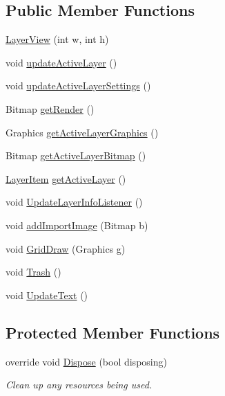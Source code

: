 \subsection*{Public Member Functions}
\begin{DoxyCompactItemize}
\item 
\mbox{\hyperlink{class_paint___program_1_1_layer_view_a237468f9156f9a2dbdde7692209acb91}{Layer\+View}} (int w, int h)
\item 
void \mbox{\hyperlink{class_paint___program_1_1_layer_view_a4872c0c1b55f0c4a1f842061def219fd}{update\+Active\+Layer}} ()
\item 
void \mbox{\hyperlink{class_paint___program_1_1_layer_view_ad82f5a23e54318684a6ff17b5ee7c32e}{update\+Active\+Layer\+Settings}} ()
\item 
Bitmap \mbox{\hyperlink{class_paint___program_1_1_layer_view_a8d4ff09153310ad7fc153cd45f8ec90d}{get\+Render}} ()
\item 
Graphics \mbox{\hyperlink{class_paint___program_1_1_layer_view_af4347af0118fb18274cfead40ebde85d}{get\+Active\+Layer\+Graphics}} ()
\item 
Bitmap \mbox{\hyperlink{class_paint___program_1_1_layer_view_a782154cc9526719190749ce372e6afdd}{get\+Active\+Layer\+Bitmap}} ()
\item 
\mbox{\hyperlink{class_paint___program_1_1_layer_item}{Layer\+Item}} \mbox{\hyperlink{class_paint___program_1_1_layer_view_ab1d91b912733c8ac3ac51087bde8ac94}{get\+Active\+Layer}} ()
\item 
void \mbox{\hyperlink{class_paint___program_1_1_layer_view_a3a8cf41dfd57b3b755331b2cd411acdb}{Update\+Layer\+Info\+Listener}} ()
\item 
void \mbox{\hyperlink{class_paint___program_1_1_layer_view_aed4ebc6256430120819f0de98d65976b}{add\+Import\+Image}} (Bitmap b)
\item 
void \mbox{\hyperlink{class_paint___program_1_1_layer_view_a8904d504aab68f82088349dba9a06e50}{Grid\+Draw}} (Graphics g)
\item 
void \mbox{\hyperlink{class_paint___program_1_1_layer_view_a0f223144d8d2e7833b530abbeb224f98}{Trash}} ()
\item 
void \mbox{\hyperlink{class_paint___program_1_1_layer_view_a9524e183d6c00b15c217e9d5c1d14aea}{Update\+Text}} ()
\end{DoxyCompactItemize}
\subsection*{Protected Member Functions}
\begin{DoxyCompactItemize}
\item 
override void \mbox{\hyperlink{class_paint___program_1_1_layer_view_a50b056c433212a850e348643339ec504}{Dispose}} (bool disposing)
\begin{DoxyCompactList}\small\item\em Clean up any resources being used. \end{DoxyCompactList}\end{DoxyCompactItemize}
